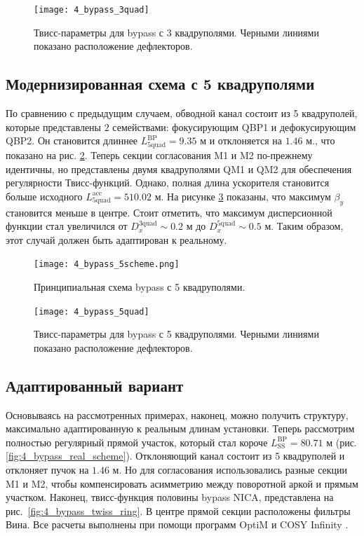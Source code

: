 \begin{figure}[!h]
  \centering
   \texttt{[image: 4\_bypass\_3quad]}
   \caption{Твисс-параметры для bypass с 3 квадруполями. Черными линиями показано расположение дефлекторов.}
   \label{fig:4_bypass_3quad}
\end{figure}

	\subsection{Модернизированная схема с 5 квадруполями}\label{sec:EDM/Wien_filter/ByPass/5quad}

\par По сравнению с предыдущим случаем, обводной канал состоит из 5 квадруполей, которые представлены 2 семействами: фокусирующим QBP1 и дефокусирующим QBP2. Он становится длиннее $L_{\textrm{5quad}}^{\textrm{BP}}=9.35$ м и отклоняется на $1.46$ м., что показано на рис. \ref{fig:4_bypass_5scheme}. Теперь секции согласования M1 и M2 по-прежнему идентичны, но представлены двумя квадруполями QM1 и QM2 для обеспечения регулярности Твисс-функций. Однако, полная длина ускорителя становится больше исходного $L_{\textrm{5quad}}^{\textrm{acc}}=510.02$ м. На рисунке \ref{fig:4_bypass_5quad} показаны, что максимум $\beta_y$ становится меньше в центре. Стоит отметить, что максимум дисперсионной функции стал увеличился от $D_x^{\textrm{3quad}} \sim 0.2$ м до $D_x^{\textrm{5quad}} \sim 0.5$ м. Таким образом, этот случай должен быть адаптирован к реальному.

\begin{figure}[!h]
  \centering
   \texttt{[image: 4\_bypass\_5scheme.png]}
   \caption{Принципиальная схема bypass с 5 квадруполями.}
   \label{fig:4_bypass_5scheme}
\end{figure}

\begin{figure}[!h]
  \centering
   \texttt{[image: 4\_bypass\_5quad]}
   \caption{Твисс-параметры для bypass с 5 квадруполями. Черными линиями показано расположение дефлекторов.}
   \label{fig:4_bypass_5quad}
\end{figure}

	\subsection{Адаптированный вариант}\label{sec:EDM/Wien_filter/ByPass/final}

\par Основываясь на рассмотренных примерах, наконец, можно получить структуру, максимально адаптированную к реальным длинам установки. Теперь рассмотрим полностью регулярный прямой участок, который стал короче $L_{\textrm{SS}}^{\textrm{BP}}=80.71$ м (рис. \ref{fig:4_bypass_real_scheme}). Отклоняющий канал состоит из 5 квадруполей и отклоняет пучок на $1.46$ м. Но для согласования использовались разные секции M1 и M2, чтобы компенсировать асимметрию между поворотной аркой и прямым участком. Наконец, твисс-функция половины bypass NICA, представлена на рис.~\ref{fig:4_bypass_twiss_ring}. В центре прямой секции расположены фильтры Вина. Все расчеты выполнены при помощи программ OptiM \cite{optim} и COSY Infinity \cite{cosy}.

